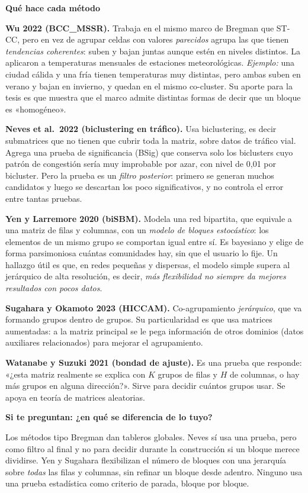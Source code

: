 \documentclass[11pt,a4paper]{article}
\newcommand{\cajainicio}[3]{\par\medskip\noindent
  \begin{lrbox}{\cajabox}\begin{minipage}{\dimexpr\linewidth-2\fboxsep-2\fboxrule\relax}%
  \textbf{\color{#1}#3}\par\smallskip}
\newcommand{\cajafin}[2]{\end{minipage}\end{lrbox}\fcolorbox{#1}{#2}{\usebox{\cajabox}}\par\medskip}
\newenvironment{nota}[1]{\cajainicio{acc}{acc!7}{#1}}{\cajafin{acc}{acc!7}}
\newcommand{\STCC}{ST-CC}
\begin{document}
\begin{nota}{Qué hace cada método}
\textbf{Wu 2022 (BCC\_MSSR).} Trabaja en el mismo marco de Bregman que \STCC, pero en vez de agrupar celdas con valores \emph{parecidos} agrupa las que tienen \emph{tendencias coherentes}: suben y bajan juntas aunque estén en niveles distintos. La aplicaron a temperaturas mensuales de estaciones meteorológicas. \textit{Ejemplo:} una ciudad cálida y una fría tienen temperaturas muy distintas, pero ambas suben en verano y bajan en invierno, y quedan en el mismo co-cluster. Su aporte para la tesis es que muestra que el marco admite distintas formas de decir que un bloque es «homogéneo».

\textbf{Neves et al.\ 2022 (biclustering en tráfico).} Usa biclustering, es decir submatrices que no tienen que cubrir toda la matriz, sobre datos de tráfico vial. Agrega una prueba de significancia (BSig) que conserva solo los biclusters cuyo patrón de congestión sería muy improbable por azar, con nivel de 0,01 por bicluster. Pero la prueba es un \emph{filtro posterior}: primero se generan muchos candidatos y luego se descartan los poco significativos, y no controla el error entre tantas pruebas.

\textbf{Yen y Larremore 2020 (biSBM).} Modela una red bipartita, que equivale a una matriz de filas y columnas, con un \emph{modelo de bloques estocástico}: los elementos de un mismo grupo se comportan igual entre sí. Es bayesiano y elige de forma parsimoniosa cuántas comunidades hay, sin que el usuario lo fije. Un hallazgo útil es que, en redes pequeñas y dispersas, el modelo simple supera al jerárquico de alta resolución, es decir, \emph{más flexibilidad no siempre da mejores resultados con pocos datos}.

\textbf{Sugahara y Okamoto 2023 (HICCAM).} Co-agrupamiento \emph{jerárquico}, que va formando grupos dentro de grupos. Su particularidad es que usa matrices aumentadas: a la matriz principal se le pega información de otros dominios (datos auxiliares relacionados) para mejorar el agrupamiento.

\textbf{Watanabe y Suzuki 2021 (bondad de ajuste).} Es una prueba que responde: «¿esta matriz realmente se explica con $K$ grupos de filas y $H$ de columnas, o hay más grupos en alguna dirección?». Sirve para decidir cuántos grupos usar. Se apoya en teoría de matrices aleatorias.
\end{nota}

\begin{nota}{Si te preguntan: ¿en qué se diferencia de lo tuyo?}
Los métodos tipo Bregman dan tableros globales. Neves sí usa una prueba, pero como filtro al final y no para decidir durante la construcción si un bloque merece dividirse. Yen y Sugahara flexibilizan el número de bloques con una jerarquía sobre \emph{todas} las filas y columnas, sin refinar un bloque desde adentro. Ninguno usa una prueba estadística como criterio de parada, bloque por bloque.
\end{nota}
\end{document}
